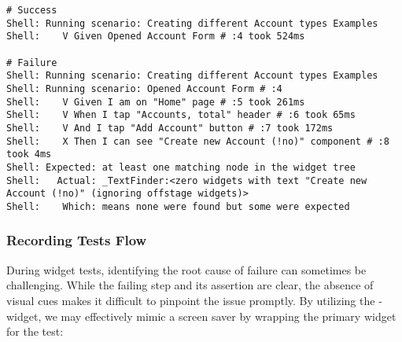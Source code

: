 \newpage
\begin{lstlisting}[language=terminal]
# Success
Shell: Running scenario: Creating different Account types Examples
Shell:    V Given Opened Account Form # :4 took 524ms

# Failure
Shell: Running scenario: Creating different Account types Examples
Shell: Running scenario: Opened Account Form # :4
Shell:    V Given I am on "Home" page # :5 took 261ms
Shell:    V When I tap "Accounts, total" header # :6 took 65ms
Shell:    V And I tap "Add Account" button # :7 took 172ms
Shell:    X Then I can see "Create new Account (!no)" component # :8 took 4ms  
Shell: Expected: at least one matching node in the widget tree
Shell:   Actual: _TextFinder:<zero widgets with text "Create new Account (!no)" (ignoring offstage widgets)>
Shell:    Which: means none were found but some were expected
\end{lstlisting}


\subsubsection{Recording Tests Flow} \label{t-record}

During widget tests, identifying the root cause of failure can sometimes be challenging. While the failing step and 
its assertion are clear, the absence of visual cues makes it difficult to pinpoint the issue promptly. By utilizing the 
-widget, we may effectively mimic a screen saver by wrapping the primary widget for the test:

